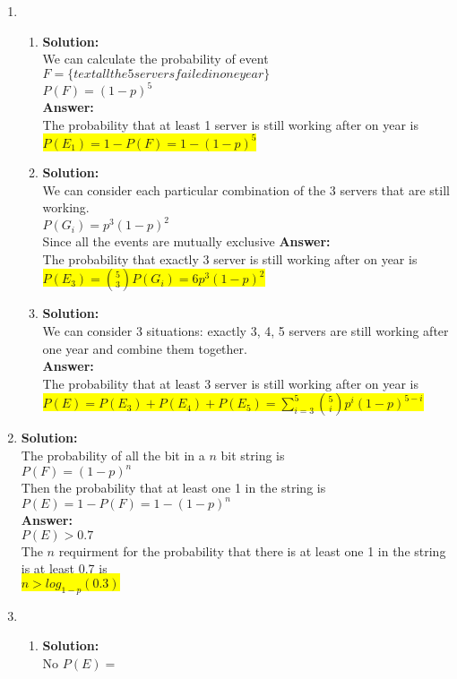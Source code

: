 \documentclass{article}
\newcommand{\myansw}{\textbf{Answer:}\\}
\newcommand{\mysolu}{\textbf{Solution:}\\}
\begin{document}
\begin{enumerate}
\begin{enumerate}
	\end{enumerate}
	\item
	\begin{enumerate}
		\item
		\mysolu
		We can calculate the probability of event ${F=\{text{all the 5 servers failed in one year}\}}$\\
		${P(F)=(1-p)^5}$\\
		\myansw
		The probability that at least 1 server is still working after on year is\\
		\colorbox{yellow}{${P(E_1)=1-P(F)=1-(1-p)^5}$}\\
		\item
		\mysolu
		We can consider each particular combination of the 3 servers that are still working.\\
		${P(G_i)=p^3(1-p)^2}$\\
		Since all the events are mutually exclusive
		\myansw
		The probability that exactly 3 server is still working after on year is\\
		\colorbox{yellow}{
			${P(E_3)={5 \choose 3}P(G_i)=6p^3(1-p)^2}$
		}\\
		\item
		\mysolu
		We can consider 3 situations: exactly 3, 4, 5 servers are still working after one year and combine them together.\\
		\myansw
		The probability that at least 3 server is still working after on year is\\
		\colorbox{yellow}{
			${P(E)=P(E_3)+P(E_4)+P(E_5)=\sum\limits_{i=3}^5 {5 \choose i}p^i(1-p)^{5-i}}$
		}\\
		
	\end{enumerate}
	\item
	\mysolu
	The probability of all the bit in a ${n}$ bit string is\\
	${P(F) = (1-p)^n}$\\
	Then the probability that at least one 1 in the string is\\
	${P(E) = 1- P(F)= 1-(1-p)^n}$\\
	\myansw
	${P(E)>0.7}$\\
	The ${n}$ requirment for the probability that there is at least one 1 in the string is at least 0.7 is\\
	\colorbox{yellow}{	
		${n>log_{1-p}(0.3)}$
	}\\
	\item
	\begin{enumerate}
		\item
		\mysolu
		No
		${P(E)=}$
	\end{enumerate}





\end{enumerate}

\newpage
\end{document}
